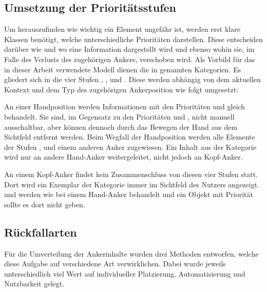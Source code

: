 		\subsection{Umsetzung der Prioritätsstufen}\label{chapter:prioSteps}
			Um herauszufinden wie wichtig ein Element ungefähr ist, werden erst klare Klassen benötigt, welche unterschiedliche Prioritäten darstellen. Diese entscheiden darüber wie und wo eine Information dargestellt wird und ebenso wohin sie, im Falle des Verlusts des zugehörigen Ankers, verschoben wird.
			Als Vorbild für das in dieser Arbeit verwendete Modell dienen die in  genannten Kategorien.
			Es gliedert sich in die vier Stufen , ,  und . Diese werden abhängig von dem aktuellen Kontext und dem Typ des zugehörigen Ankerposition wie folgt umgesetzt:
			
			An einer Handposition werden Informationen mit den Prioritäten  und  gleich behandelt. Sie sind, im Gegensatz zu den Prioritäten  und , nicht manuell ausschaltbar, aber können dennoch durch das Bewegen der Hand aus dem Sichtfeld entfernt werden. Beim Wegfall der Handposition werden alle Elemente der Stufen ,  und  einem anderen Anker zugewiesen. Ein Inhalt aus der Kategorie  wird nur an andere Hand-Anker weitergeleitet, nicht jedoch an Kopf-Anker.
			
			
			An einem Kopf-Anker findet kein Zusammenschluss von diesen vier Stufen statt. Dort wird ein Exemplar der Kategorie  immer im Sichtfeld des Nutzers angezeigt.  und  werden wie bei einem Hand-Anker behandelt und ein Objekt mit Priorität  sollte es dort nicht geben.
			
			
		\subsection{Rückfallarten}\label{chapter:fallback}
			Für die Umverteilung der Ankerinhalte wurden drei Methoden entworfen, welche diese Aufgabe auf verschiedene Art verwirklichen. Dabei wurde jeweils unterschiedlich viel Wert auf individueller Platzierung, Automatisierung und Nutzbarkeit gelegt.
			
